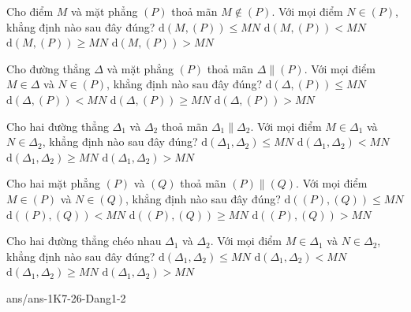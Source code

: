 \begin{ex}%
	Cho điểm $M$ và mặt phẳng $(P)$ thoả mãn $M\not \in (P)$. Với mọi điểm $N \in (P)$, khẳng định nào sau đây đúng?
	\choice
	{\True $\mathrm{d}(M,(P)) \le MN$}
	{$\mathrm{d}(M,(P)) < MN$}
	{$\mathrm{d}(M,(P)) \ge MN$}
	{$\mathrm{d}(M,(P)) > MN$}
\end{ex}
\begin{ex}%
	Cho đường thẳng $\Delta$ và mặt phẳng $(P)$ thoả mãn $\Delta \parallel (P)$. Với mọi điểm $M \in\Delta$ và $N \in (P)$, khẳng định nào sau đây đúng?
	\choice
	{\True $\mathrm{d}(\Delta, (P)) \le MN$}
	{$\mathrm{d}(\Delta, (P)) < MN$}
	{$\mathrm{d}(\Delta, (P)) \ge MN$}
	{$\mathrm{d}(\Delta, (P)) > MN$}
\end{ex}
\begin{ex}%
	Cho hai đường thẳng $\Delta_1$ và $\Delta_2$ thoả mãn $\Delta_1 \parallel \Delta_2$. Với mọi điểm $M \in\Delta_1$ và $N \in \Delta_2$, khẳng định nào sau đây đúng?
	\choice
	{\True $\mathrm{d}(\Delta_1,\Delta_2) \le MN$}
	{$\mathrm{d}(\Delta_1,\Delta_2) < MN$}
	{$\mathrm{d}(\Delta_1,\Delta_2) \ge MN$}
	{$\mathrm{d}(\Delta_1,\Delta_2) > MN$}
\end{ex}
\begin{ex}%
	Cho hai mặt phẳng $(P)$ và $(Q)$ thoả mãn $(P) \parallel (Q)$. Với mọi điểm $M\in (P)$ và $N\in (Q)$, khẳng định nào sau đây đúng?
	\choice
	{\True $\mathrm{d}((P),(Q)) \le MN$}
	{$\mathrm{d}((P),(Q)) < MN$}
	{$\mathrm{d}((P),(Q)) \ge MN$}
	{$\mathrm{d}((P),(Q)) > MN$}
\end{ex}
\begin{ex}%
	Cho hai đường thẳng chéo nhau $\Delta_1$ và $\Delta_2$. Với mọi điểm $M \in\Delta_1$ và $N \in \Delta_2$, khẳng định nào sau đây đúng?
	\choice
	{\True $\mathrm{d}(\Delta_1,\Delta_2) \le MN$}
	{$\mathrm{d}(\Delta_1,\Delta_2) < MN$}
	{$\mathrm{d}(\Delta_1,\Delta_2) \ge MN$}
	{$\mathrm{d}(\Delta_1,\Delta_2) > MN$}
\end{ex}
\begin{indapan}{10}
	{ans/ans-1K7-26-Dang1-2}
\end{indapan}


